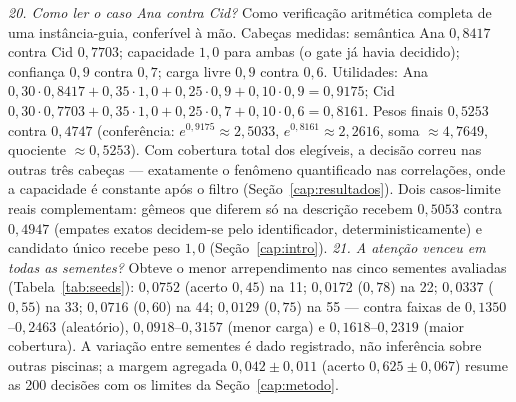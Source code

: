 \textit{20. Como ler o caso Ana contra Cid?} Como verificação aritmética completa de uma instância-guia, conferível à mão. Cabeças medidas: semântica Ana $0{,}8417$ contra Cid $0{,}7703$; capacidade $1{,}0$ para ambas (o gate já havia decidido); confiança $0{,}9$ contra $0{,}7$; carga livre $0{,}9$ contra $0{,}6$. Utilidades: Ana $0{,}30\cdot0{,}8417+0{,}35\cdot1{,}0+0{,}25\cdot0{,}9+0{,}10\cdot0{,}9=0{,}9175$; Cid $0{,}30\cdot0{,}7703+0{,}35\cdot1{,}0+0{,}25\cdot0{,}7+0{,}10\cdot0{,}6=0{,}8161$. Pesos finais $0{,}5253$ contra $0{,}4747$ (conferência: $e^{0{,}9175}\approx2{,}5033$, $e^{0{,}8161}\approx2{,}2616$, soma $\approx4{,}7649$, quociente $\approx0{,}5253$). Com cobertura total dos elegíveis, a decisão correu nas outras três cabeças --- exatamente o fenômeno quantificado nas correlações, onde a capacidade é constante após o filtro (Seção~\ref{cap:resultados}). Dois casos-limite reais complementam: gêmeos que diferem só na descrição recebem $0{,}5053$ contra $0{,}4947$ (empates exatos decidem-se pelo identificador, deterministicamente) e candidato único recebe peso $1{,}0$ (Seção~\ref{cap:intro}).
\textit{21. A atenção venceu em todas as sementes?} Obteve o menor arrependimento nas cinco sementes avaliadas (Tabela~\ref{tab:seeds}): $0{,}0752$ (acerto $0{,}45$) na 11; $0{,}0172$ ($0{,}78$) na 22; $0{,}0337$ ($0{,}55$) na 33; $0{,}0716$ ($0{,}60$) na 44; $0{,}0129$ ($0{,}75$) na 55 --- contra faixas de $0{,}1350$--$0{,}2463$ (aleatório), $0{,}0918$--$0{,}3157$ (menor carga) e $0{,}1618$--$0{,}2319$ (maior cobertura). A variação entre sementes é dado registrado, não inferência sobre outras piscinas; a margem agregada $0{,}042\pm0{,}011$ (acerto $0{,}625\pm0{,}067$) resume as 200 decisões com os limites da Seção~\ref{cap:metodo}.
